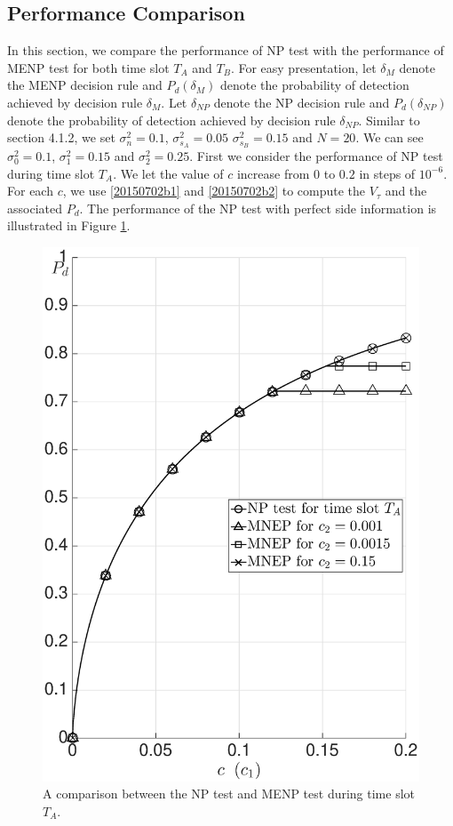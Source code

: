 \subsection{Performance Comparison}
In this section, we compare the performance of NP test with the performance of MENP test for both time slot $T_A$ and $T_B$. For easy presentation, let $\delta_{M}$ denote the MENP decision rule and $P_d(\delta_M)$ denote the probability of detection achieved by decision rule $\delta_{M}$.  
Let $\delta_{NP} $ denote the NP decision rule and $P_d(\delta_{NP})$ denote the probability of detection achieved by decision rule $\delta_{NP}$. 
Similar to section 4.1.2, we set $\sigma_n^2= 0.1$, $\sigma_{s_A}^2 = 0.05$ $\sigma_{s_B}^2 = 0.15$ and $N=20$. We can see $\sigma_0^2 = 0.1$, $\sigma_1^2=0.15$ and $\sigma_2^2 = 0.25$. First we consider the performance of NP test during time slot $T_A$. We let the value of $c$ increase from $0$ to $0.2$ in steps of $10^{-6}$. For each $c$, we use \eqref{20150702b1} and \eqref{20150702b2} to compute the $V_\tau$ and the associated $P_d$.  
The performance of the NP test with perfect side information is illustrated in Figure \ref{pic:20150702a0}.  

\begin{figure}[!hbp]
  \centering
  \includegraphics[width = 14cm]{5/SIa.eps}
  \caption{A comparison between the NP test and MENP test during time slot $T_A$.} 
  \label{pic:20150702a0}
\end{figure} 

